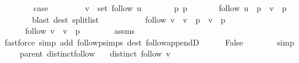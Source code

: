 \begin{isabellebody}
\isamarkupfalse%
\isanewline
\ \ \isamarkupfalse%
\ {}\isanewline
\ \ \isamarkupfalse%
\ {\isacharquery}{\kern0pt}case\isanewline
\ \ \isamarkupfalse%
\isanewline
\ \ \ \ \isamarkupfalse%
\ {\isachardoublequoteopen}v\ {\isasymin}\ set\ {\isacharparenleft}{\kern0pt}follow\ u{\isacharparenright}{\kern0pt}{\isachardoublequoteclose}\isanewline
\ \ \ \ \isamarkupfalse%
\ \isamarkupfalse%
\ p\ p{\isacharprime}{\kern0pt}\ \isanewline
\ \ \ \ \ \ {\isachardoublequoteopen}follow\ u\ {\isacharequal}{\kern0pt}\ p\ {\isacharat}{\kern0pt}\ v\ {\isacharhash}{\kern0pt}\ p{\isacharprime}{\kern0pt}{\isachardoublequoteclose}\isanewline
\ \ \ \ \ \ \isamarkupfalse%
\ {\isacharparenleft}{\kern0pt}blast\ dest{\isacharcolon}{\kern0pt}\ split{\isacharunderscore}{\kern0pt}list{\isacharparenright}{\kern0pt}\isanewline
\ \ \ \ \isamarkupfalse%
\isanewline
\ \ \ \ \ \ {\isachardoublequoteopen}follow\ v\ {\isacharequal}{\kern0pt}\ v\ {\isacharhash}{\kern0pt}\ {\isacharparenleft}{\kern0pt}p\ {\isacharat}{\kern0pt}\ v\ {\isacharhash}{\kern0pt}\ p{\isacharprime}{\kern0pt}{\isacharparenright}{\kern0pt}{\isachardoublequoteclose}\isanewline
\ \ \ \ \ \ {\isachardoublequoteopen}follow\ v\ {\isacharequal}{\kern0pt}\ v\ {\isacharhash}{\kern0pt}\ p{\isacharprime}{\kern0pt}{\isachardoublequoteclose}\isanewline
\ \ \ \ \ \ \isamarkupfalse%
\ assms\isanewline
\ \ \ \ \ \ \isamarkupfalse%
\ {\isacharparenleft}{\kern0pt}fastforce\ simp\ add{\isacharcolon}{\kern0pt}\ follow{\isacharunderscore}{\kern0pt}psimps\ dest{\isacharcolon}{\kern0pt}\ follow{\isacharunderscore}{\kern0pt}appendD{\isacharparenright}{\kern0pt}{\isacharplus}{\kern0pt}\isanewline
\ \ \ \ \isamarkupfalse%
\ False\isanewline
\ \ \ \ \ \ \isamarkupfalse%
\ simp\isanewline
\ \ \isamarkupfalse%
\isanewline
{}\isamarkupfalse%
%
\endisatagproof
{\isafoldproof}%
%
\isadelimproof
\isanewline
%
\endisadelimproof
\isanewline
{}\isamarkupfalse%
\ {\isacharparenleft}{\kern0pt}\ parent{\isacharparenright}{\kern0pt}\ distinct{\isacharunderscore}{\kern0pt}follow{\isacharcolon}{\kern0pt}\isanewline
\ \ \ {\isachardoublequoteopen}distinct\ {\isacharparenleft}{\kern0pt}follow\ v{\isacharparenright}{\kern0pt}{\isachardoublequoteclose}\isanewline
%
\isadelimproof
%
\endisadelimproof
%
\isatagproof
{}\isamarkupfalse%

\end{isabellebody}
